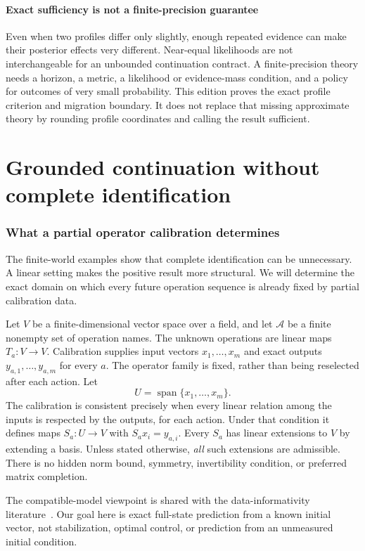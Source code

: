 \documentclass[11pt,letterpaper]{article}
\theoremstyle{plain}
\theoremstyle{definition}
\newcommand{\A}{\mathcal A}\newcommand{\C}{\mathcal C}\newcommand{\E}{\mathcal E}
\newcommand{\Span}{\operatorname{span}}\newcommand{\Pow}{\mathcal P}
\begin{document}
\subsection{Exact sufficiency is not a finite-precision guarantee}
Even when two profiles differ only slightly, enough repeated evidence can make their posterior effects very different. Near-equal likelihoods are not interchangeable for an unbounded continuation contract. A finite-precision theory needs a horizon, a metric, a likelihood or evidence-mass condition, and a policy for outcomes of very small probability. This edition proves the exact profile criterion and migration boundary. It does not replace that missing approximate theory by rounding profile coordinates and calling the result sufficient.


\FloatBarrier\clearpage
\part{Grounded continuation without complete identification}
\section{What a partial operator calibration determines}\label{sec:linear}
The finite-world examples show that complete identification can be unnecessary. A linear setting makes the positive result more structural. We will determine the exact domain on which every future operation sequence is already fixed by partial calibration data.

Let $V$ be a finite-dimensional vector space over a field, and let $\A$ be a finite nonempty set of operation names. The unknown operations are linear maps $T_a:V\to V$. Calibration supplies input vectors $x_1,\ldots,x_m$ and exact outputs $y_{a,1},\ldots,y_{a,m}$ for every $a$. The operator family is fixed, rather than being reselected after each action. Let
\[
U=\Span\{x_1,\ldots,x_m\}.
\]
The calibration is consistent precisely when every linear relation among the inputs is respected by the outputs, for each action. Under that condition it defines maps $S_a:U\to V$ with $S_ax_i=y_{a,i}$. Every $S_a$ has linear extensions to $V$ by extending a basis. Unless stated otherwise, \emph{all} such extensions are admissible. There is no hidden norm bound, symmetry, invertibility condition, or preferred matrix completion.

The compatible-model viewpoint is shared with the data-informativity literature~\cite{informativity}. Our goal here is exact full-state prediction from a known initial vector, not stabilization, optimal control, or prediction from an unmeasured initial condition.
\end{document}
